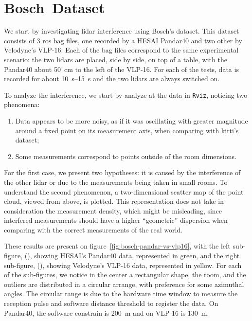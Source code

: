 

\section{Bosch\cp~Dataset}
We start by investigating \ac{lidar} interference using Bosch's dataset. This dataset consists of 3 \ac{ros} bag files, one recorded by a HESAI Pandar40 and two other by Velodyne's VLP-16. Each of the bag files correspond to the same experimental scenario: the two \acp{lidar} are placed, side by side, on top of a table, with the Pandar40 about \SI{50}{\centi\meter} to the left of the VLP-16. For each of the tests, data is recorded for about \SIrange{10}{15}{\second} and the two \acp{lidar} are always switched on.

To analyze the interference, we start by analyze at the data in \texttt{Rviz}, noticing two phenomena: 

\begin{enumerate}
\item Data appears to be more noisy, as if it was oscillating with greater magnitude around a fixed point on its measurement axis, when comparing with \ac{kitti}'s dataset;
\item Some measurements correspond to points outside of the room dimensions.
\end{enumerate}

For the first case, we present two hypotheses: it is caused by the interference of the other \ac{lidar} or due to the measurements being taken in small rooms. To understand the second phenomenon, a two-dimensional scatter map of the point cloud, viewed from above, is plotted. This representation does not take in consideration the measurement density, which might be misleading, since interfered measurements should have a higher ``geometric'' dispersion when comparing with the correct measurements of the real world.

These results are present on figure~\ref{fig:bosch-pandar-vs-vlp16}, with the left sub-figure, (), showing HESAI's Pandar40 data, represented in green, and the right sub-figure, (), showing Velodyne's VLP-16 data, represented in yellow. For each of the sub-figures, we notice in the center a rectangular shape, the room, and the outliers are distributed in a circular arrange, with preference for some azimuthal angles. The circular range is due to the hardware time window to measure the reception pulse and software distance threshold to register the data. On Pandar40, the software constrain is \SI{200}{\meter} and on VLP-16 is \SI{130}{\meter}. 

